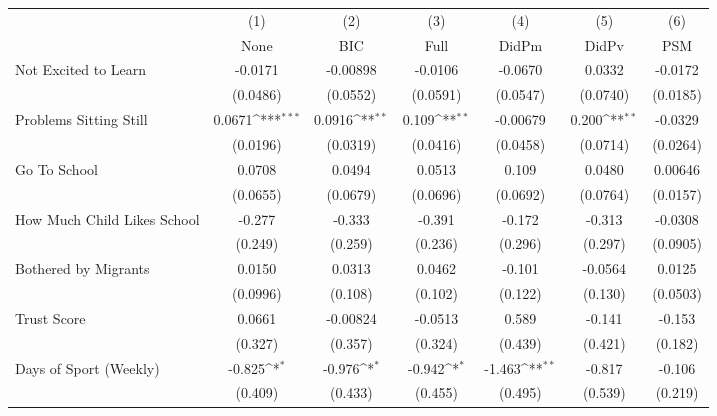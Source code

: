 {
\def\sym#1{\ifmmode^{#1}\else\(^{#1}\)\fi}
\begin{tabular}{l*{6}{c}}
\toprule
            &\multicolumn{1}{c}{(1)}&\multicolumn{1}{c}{(2)}&\multicolumn{1}{c}{(3)}&\multicolumn{1}{c}{(4)}&\multicolumn{1}{c}{(5)}&\multicolumn{1}{c}{(6)}\\
            &\multicolumn{1}{c}{None}&\multicolumn{1}{c}{BIC}&\multicolumn{1}{c}{Full}&\multicolumn{1}{c}{DidPm}&\multicolumn{1}{c}{DidPv}&\multicolumn{1}{c}{PSM}\\
\midrule
Not Excited to Learn&     -0.0171         &    -0.00898         &     -0.0106         &     -0.0670         &      0.0332         &     -0.0172         \\
            &    (0.0486)         &    (0.0552)         &    (0.0591)         &    (0.0547)         &    (0.0740)         &    (0.0185)         \\
\addlinespace
Problems Sitting Still&      0.0671\sym{***}&      0.0916\sym{**} &       0.109\sym{**} &    -0.00679         &       0.200\sym{**} &     -0.0329         \\
            &    (0.0196)         &    (0.0319)         &    (0.0416)         &    (0.0458)         &    (0.0714)         &    (0.0264)         \\
\addlinespace
Go To School&      0.0708         &      0.0494         &      0.0513         &       0.109         &      0.0480         &     0.00646         \\
            &    (0.0655)         &    (0.0679)         &    (0.0696)         &    (0.0692)         &    (0.0764)         &    (0.0157)         \\
\addlinespace
How Much Child Likes School&      -0.277         &      -0.333         &      -0.391         &      -0.172         &      -0.313         &     -0.0308         \\
            &     (0.249)         &     (0.259)         &     (0.236)         &     (0.296)         &     (0.297)         &    (0.0905)         \\
\addlinespace
Bothered by Migrants&      0.0150         &      0.0313         &      0.0462         &      -0.101         &     -0.0564         &      0.0125         \\
            &    (0.0996)         &     (0.108)         &     (0.102)         &     (0.122)         &     (0.130)         &    (0.0503)         \\
\addlinespace
Trust Score &      0.0661         &    -0.00824         &     -0.0513         &       0.589         &      -0.141         &      -0.153         \\
            &     (0.327)         &     (0.357)         &     (0.324)         &     (0.439)         &     (0.421)         &     (0.182)         \\
\addlinespace
Days of Sport (Weekly)&      -0.825\sym{*}  &      -0.976\sym{*}  &      -0.942\sym{*}  &      -1.463\sym{**} &      -0.817         &      -0.106         \\
            &     (0.409)         &     (0.433)         &     (0.455)         &     (0.495)         &     (0.539)         &     (0.219)         \\
\bottomrule
\end{tabular}
}
